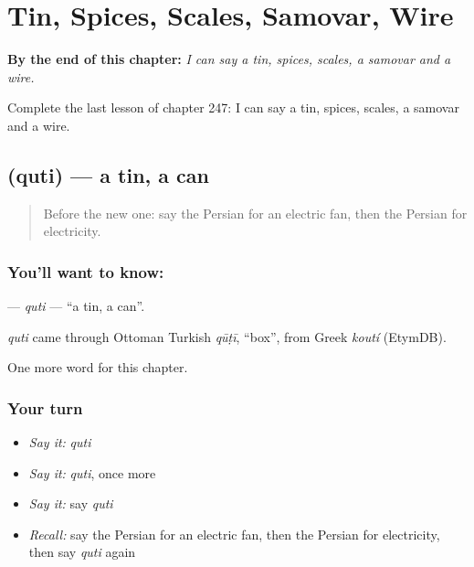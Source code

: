 
\chapter{Tin, Spices, Scales, Samovar, Wire}
\label{ch:fa-tin-spices-scales-samovar-wire}

\begin{chapteropening}
\textbf{By the end of this chapter:} \emph{I can say a tin, spices, scales, a samovar and a wire.}

Complete the last lesson of chapter 247: I can say a tin, spices, scales, a samovar and a wire.
\end{chapteropening}

\section[\texorpdfstring{\fa{قوطی} (quti)}{قوطی (quti)}]{ (quti) — a tin, a can}

\label{lesson:FA-C247-quti}



\begin{quote}
Before the new one: say the Persian for an electric fan, then the Persian for electricity.
\end{quote}

\subsection*{You'll want to know: }
\textbf{} — \emph{quti} — \textquotedblleft{}a tin, a can\textquotedblright{}.

\begin{cousinweb}
\emph{quti} came through Ottoman Turkish \emph{qūṭī}, \textquotedblleft{}box\textquotedblright{}, from Greek \emph{koutí} (EtymDB).
\end{cousinweb}

\begin{grammarlens}[title={What you've built}]
One more word for this chapter.
\end{grammarlens}

\subsection*{Your turn}
\begin{itemize}
\raggedright
  \item \emph{Say it:} \emph{quti}
  \item \emph{Say it:} \emph{quti}, once more
  \item \emph{Say it:} say \emph{quti}
  \item \emph{Recall:} say the Persian for an electric fan, then the Persian for electricity, then say \emph{quti} again
\end{itemize}

